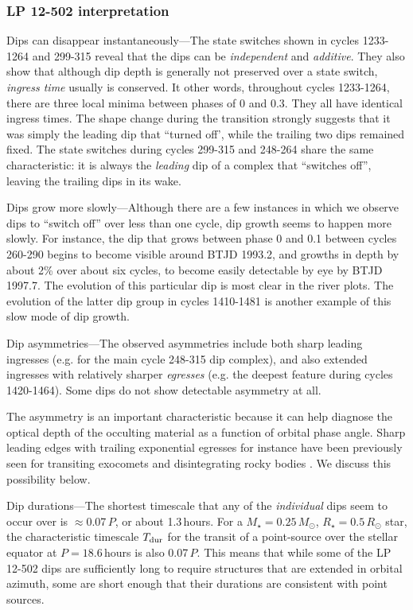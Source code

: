 \documentclass[11pt,twocolumn,tighten]{aastex63}
\begin{document}
\subsubsection{LP 12-502 interpretation}

{\sc Dips can disappear instantaneously}---The state switches shown in
cycles 1233-1264 and 299-315 reveal that the dips can be {\it
independent} and {\it additive}.  They also show that although dip
depth is generally not preserved over a state switch, {\it ingress
time} usually is conserved.  It other words, throughout cycles
1233-1264, there are three local minima between phases of 0 and 0.3.
They all have identical ingress times.  The shape change during the
transition strongly suggests that it was simply the leading dip that
``turned off', while the trailing two dips remained fixed.  The state
switches during cycles 299-315 and 248-264 share the same
characteristic: it is always the {\it leading} dip of a complex that
``switches off'', leaving the trailing dips in its wake.

{\sc Dips grow more slowly}---Although there are a few instances in
which we observe dips to ``switch off'' over less than one cycle, dip
growth seems to happen more slowly.  For instance, the dip that grows
between phase 0 and 0.1 between cycles 260-290 begins to become
visible around BTJD 1993.2, and growths in depth by about 2\% over
about six cycles, to become easily detectable by eye by BTJD 1997.7.
The evolution of this particular dip is most clear in the river plots.
The evolution of the latter dip group in cycles 1410-1481 is another
example of this slow mode of dip growth.

{\sc Dip asymmetries}---The observed asymmetries include both sharp
leading ingresses (e.g. for the main cycle 248-315 dip complex), and
also extended ingresses with relatively sharper {\it egresses} (e.g.
the deepest feature during cycles 1420-1464).  Some dips do not show
detectable asymmetry at all.

The asymmetry is an important characteristic because it can help
diagnose the optical depth of the occulting material as a function of
orbital phase angle.  Sharp leading edges with trailing exponential
egresses for instance have been previously seen for transiting
exocomets and disintegrating rocky bodies
\citep[e.g.][]{2012ApJ...752....1R,2012A&A...545L...5B,2015Natur.526..546V,2019A&A...625L..13Z}.
We discuss this possibility below.


{\sc Dip durations}---The shortest timescale that any of the {\it
individual} dips seem to occur over is $\approx$0.07\,$P$, or about
1.3\,hours.  For a $M_\star=0.25\,M_\odot$, $R_\star=0.5\,R_\odot$
star, the characteristic timescale $T_{\rm dur}$ for the transit of a
point-source over the stellar equator at $P=18.6\,$hours is also
0.07\,$P$.  This means that while some of the LP 12-502 dips are
sufficiently long to require structures that are extended in orbital
azimuth, some are short enough that their durations are consistent
with point sources.
\end{document}
